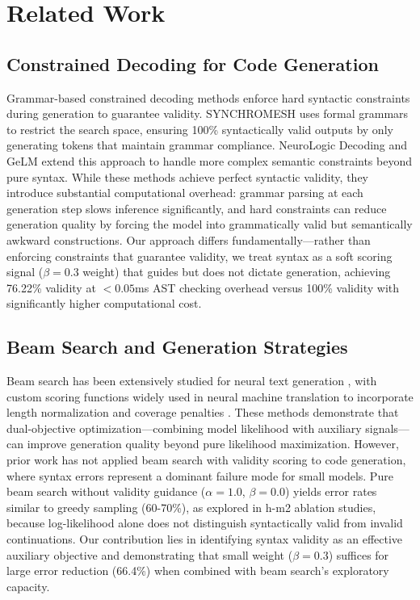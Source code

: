 \section{Related Work}

\subsection{Constrained Decoding for Code Generation}

Grammar-based constrained decoding methods enforce hard syntactic constraints during generation to guarantee validity. SYNCHROMESH \cite{Poesia2022} uses formal grammars to restrict the search space, ensuring 100\% syntactically valid outputs by only generating tokens that maintain grammar compliance. NeuroLogic Decoding \cite{Lu2021} and GeLM \cite{Qian2022} extend this approach to handle more complex semantic constraints beyond pure syntax. While these methods achieve perfect syntactic validity, they introduce substantial computational overhead: grammar parsing at each generation step slows inference significantly, and hard constraints can reduce generation quality by forcing the model into grammatically valid but semantically awkward constructions. Our approach differs fundamentally---rather than enforcing constraints that guarantee validity, we treat syntax as a soft scoring signal ($\beta=0.3$ weight) that guides but does not dictate generation, achieving 76.22\% validity at $<0.05$ms AST checking overhead versus 100\% validity with significantly higher computational cost.

\subsection{Beam Search and Generation Strategies}

Beam search has been extensively studied for neural text generation \cite{Freitag2017}, with custom scoring functions widely used in neural machine translation to incorporate length normalization \cite{Wu2016} and coverage penalties \cite{Tu2016}. These methods demonstrate that dual-objective optimization---combining model likelihood with auxiliary signals---can improve generation quality beyond pure likelihood maximization. However, prior work has not applied beam search with validity scoring to code generation, where syntax errors represent a dominant failure mode for small models. Pure beam search without validity guidance ($\alpha=1.0$, $\beta=0.0$) yields error rates similar to greedy sampling (60-70\%), as explored in h-m2 ablation studies, because log-likelihood alone does not distinguish syntactically valid from invalid continuations. Our contribution lies in identifying syntax validity as an effective auxiliary objective and demonstrating that small weight ($\beta=0.3$) suffices for large error reduction (66.4\%) when combined with beam search's exploratory capacity.

